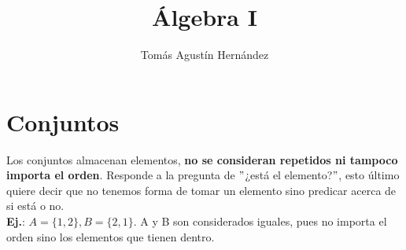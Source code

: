 \documentclass[10pt,a4paper]{article}
\title{Álgebra I}
\author{Tomás Agustín Hernández}
\date{}
\begin{document}
\maketitle

\begin{figure}[b]
    \centering
\end{figure}

\newpage
\section*{Conjuntos}
Los conjuntos almacenan elementos, \textbf{no se consideran repetidos ni tampoco importa el orden}. Responde a la pregunta de $"$¿está el elemento?$"$, esto último quiere decir que no tenemos forma de tomar un elemento sino predicar acerca de si está o no. \\
\textbf{Ej.}: $ A = \{1, 2\}, B = \{2, 1\}$. A y B son considerados iguales, pues no importa el orden sino los elementos que tienen dentro.
\end{document}

